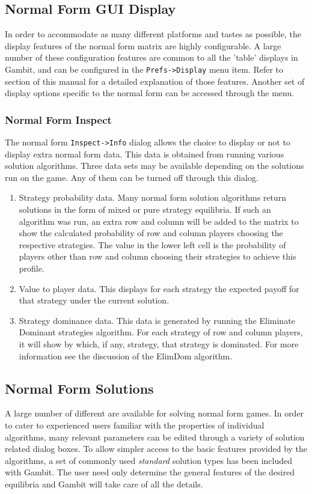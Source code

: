 {\subsection{Normal Form GUI Display}
In order to accommodate as many different platforms and tastes as possible,
the display features of the normal form matrix are highly configurable.  A
large number of these configuration features are common to all the 'table'
displays in Gambit, and can be configured in the {\tt Prefs->Display} 
menu item.  Refer to  section
of this manual for a detailed explanation of those features.  Another set
of display options specific to the normal form can be accessed through the 
 menu.

\subsubsection{Normal Form Inspect}\label{nfinspectsec}
The normal form {\tt Inspect->Info} dialog allows the choice to 
display or not to display extra
normal form data.  This data is obtained from running various solution
algorithms.  Three data sets may be available depending on the solutions
run on the game.  Any of them can be turned off through this dialog.
\begin{enumerate}
\item Strategy probability data.  Many normal form solution
algorithms return solutions in the form of mixed or pure strategy
equilibria.  If such an algorithm was run, an extra row and column will be
added to the matrix to show the calculated probability of row and column
players choosing the respective strategies.  The value in the lower left
cell is the probability of players other than row and column choosing
their strategies to achieve this profile.
\item Value to player data.  This displays for each strategy the expected 
payoff for that strategy under the current solution.  
\item Strategy dominance data.  This data is generated by running
the Eliminate Dominant strategies algorithm.  For each strategy of row and
column players, it will show by which, if any, strategy, that strategy is
dominated.  For more information see the discussion of the ElimDom
algorithm.
\end{enumerate}

\subsection{Normal Form Solutions}\label{NormalFormSolutions}
A large number of different  are 
available for solving normal form
games.  In order to cater to experienced users familiar with the 
properties of individual algorithms, many relevant parameters can
be edited through a variety of solution related dialog boxes.  To allow 
simpler access to the basic features provided by the algorithms, a set of
commonly used {\em standard} solution types has been included with Gambit.
The user need only determine the general features of the desired equilibria
and Gambit will take care of all the details.

}

